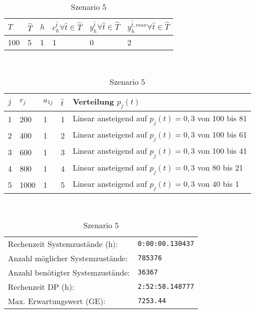\begin{table}[h!]
\renewcommand{\arraystretch}{1.5}
  \begin{center}
    \caption{Szenario 5}  \label{S5}
    \vspace*{3mm}
    \begin{tabular}{l l l l l l}   %
    $T$ & $\hat T$  & $h$ & $c_h^{\hat t}\forall \hat{t}\in{\hat T}$ & $y_h^{\hat t}\forall \hat{t}\in{\hat T}$  & $y_h^{{\hat t},max}\forall \hat{t}\in{\hat T}$  \\  \hline
100 & 5 & 1 & 1 & 0 & 2  \\ \hline
    \end{tabular} \\[3mm]
        \begin{tabular}{p{.5cm} p{.5cm} p{.5cm}  p{.5cm} p{9cm}}   %
    $j$ & $r_j$  & $a_{1j}$ & $\hat t$ & Verteilung $p_j(t)$ \\  \hline
1 & 200 & 1 & 1 & Linear ansteigend auf $p_j(t)=0,3$ von 100 bis 81   \\
2 & 400 & 1 & 2 & Linear ansteigend auf $p_j(t)=0,3$ von 100 bis 61  \\
3 & 600 & 1 & 3 & Linear ansteigend auf $p_j(t)=0,3$ von 100 bis 41  \\
4 & 800 & 1 & 4 & Linear ansteigend auf $p_j(t)=0,3$ von 80 bis 21  \\
5 & 1000 & 1 & 5 & Linear ansteigend auf $p_j(t)=0,3$ von 40 bis 1 \\
\hline
    \end{tabular} \\[3mm]
     \begin{tabular}{p{7cm}p{5cm}} \hline
     Rechenzeit Systemzustände (h): & \texttt{0:00:00.130437} \\
     Anzahl möglicher Systemzustände: & \texttt{785376} \\
     Anzahl benötigter Systemzustände: & \texttt{36367} \\ 
     Rechenzeit DP (h): & \texttt{2:52:58.148777} \\ 
          Max. Erwartungswert (GE): & \texttt{7253.44} \\ \hline
         \end{tabular} \\[3mm]
  \end{center}
\end{table}

